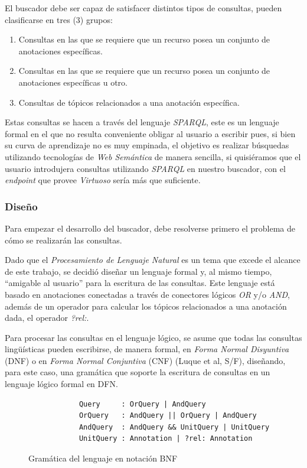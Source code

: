\begin{itemize}
El buscador debe ser capaz de satisfacer distintos tipos de consultas, pueden clasificarse en tres (3) grupos:

\begin{enumerate}
    \item Consultas en las que se requiere que un recurso posea un conjunto de anotaciones específicas.
    \item Consultas en las que se requiere que un recurso posea un conjunto de anotaciones específicas u otro.
    \item Consultas de tópicos relacionados a una anotación específica.
\end{enumerate}

Estas consultas se hacen a través del lenguaje \textit{SPARQL}, este es un lenguaje formal en el que no resulta conveniente obligar al usuario a escribir pues, si bien su curva de aprendizaje no es muy empinada, el objetivo es realizar búsquedas utilizando tecnologías de \textit{Web Semántica} de manera sencilla, si quisiéramos que el usuario introdujera consultas utilizando \textit{SPARQL} en nuestro buscador, con el \textit{endpoint} que provee \textit{Virtuoso} sería más que suficiente.

\subsubsection{Diseño}
Para empezar el desarrollo del buscador, debe resolverse primero el problema de cómo se realizarán las consultas.

Dado que el \textit{Procesamiento de Lenguaje Natural} es un tema que excede el alcance de este trabajo, se decidió diseñar un lenguaje formal y, al mismo tiempo, ``amigable al usuario'' para la escritura de las consultas. Este lenguaje está basado en anotaciones conectadas a través de conectores lógicos \textit{OR} y/o \textit{AND}, además de un operador para calcular los tópicos relacionados a una anotación dada, el operador \textit{?rel:}.

Para procesar las consultas en el lenguaje lógico, se asume que todas las consultas lingüísticas pueden escribirse, de manera formal, en \textit{Forma Normal Disyuntiva} (DNF) o en \textit{Forma Normal Conjuntiva} (CNF) (Luque et al, S/F), diseñando, para este caso, una gramática que soporte la escritura de consultas en un lenguaje lógico formal en DFN.

\begin{figure}[!h]
    \begin{center}
        \begin{verbatim} 
            Query     : OrQuery | AndQuery
            OrQuery   : AndQuery || OrQuery | AndQuery
            AndQuery  : AndQuery && UnitQuery | UnitQuery
            UnitQuery : Annotation | ?rel: Annotation
        \end{verbatim}
        \caption{Gramática del lenguaje en notación BNF}
        \label{BNFGrammar}
    \end{center}
\end{figure}


\end{itemize}
